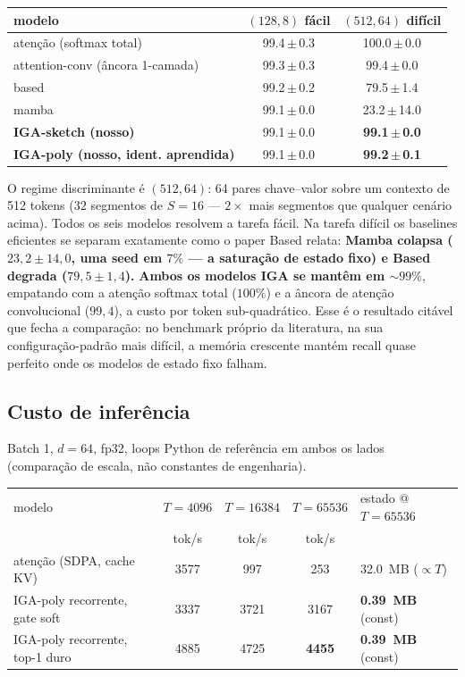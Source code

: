 \documentclass[11pt]{article}
\begin{document}
\begin{table}[h]\centering
\begin{tabular}{lcc}
\toprule
modelo & $(128,8)$ f\'acil & $(512,64)$ dif\'icil \\
\midrule
aten\c{c}\~ao (softmax total)          & 99.4\,$\pm$\,0.3 & 100.0\,$\pm$\,0.0 \\
attention-conv (\^ancora 1-camada)   & 99.3\,$\pm$\,0.3 & 99.4\,$\pm$\,0.0 \\
based                             & 99.2\,$\pm$\,0.2 & 79.5\,$\pm$\,1.4 \\
mamba                             & 99.1\,$\pm$\,0.0 & 23.2\,$\pm$\,14.0 \\
\textbf{IGA-sketch (nosso)}        & 99.1\,$\pm$\,0.0 & \textbf{99.1\,$\pm$\,0.0} \\
\textbf{IGA-poly (nosso, ident. aprendida)} & 99.1\,$\pm$\,0.0 & \textbf{99.2\,$\pm$\,0.1} \\
\bottomrule
\end{tabular}
\end{table}

O regime discriminante \'e $(512,64)$: 64 pares chave--valor sobre um contexto
de 512 tokens ($32$ segmentos de $S=16$ --- $2\times$ mais segmentos que qualquer
cen\'ario acima). Todos os seis modelos resolvem a tarefa f\'acil. Na tarefa
dif\'icil os baselines eficientes se separam exatamente como o paper Based
relata: \textbf{Mamba colapsa ($23{,}2\pm14{,}0$, uma seed em $7\%$ --- a
satura\c{c}\~ao de estado fixo) e Based degrada ($79{,}5\pm1{,}4$).}
\textbf{Ambos os modelos IGA se mant\^em em $\sim\!99\%$}, empatando com a
aten\c{c}\~ao softmax total ($100\%$) e a \^ancora de aten\c{c}\~ao convolucional
($99{,}4$), a custo por token sub-quadr\'atico. Esse \'e o resultado cit\'avel que
fecha a compara\c{c}\~ao: no benchmark pr\'oprio da literatura, na sua
configura\c{c}\~ao-padr\~ao mais dif\'icil, a mem\'oria crescente mant\'em recall
quase perfeito onde os modelos de estado fixo falham.

\subsection{Custo de infer\^encia}

Batch 1, $d=64$, fp32, loops Python de refer\^encia em ambos os lados
(compara\c{c}\~ao de escala, n\~ao constantes de engenharia).

\begin{table}[h]\centering
\begin{tabular}{lcccl}
\toprule
modelo & $T{=}4096$ & $T{=}16384$ & $T{=}65536$ & estado @ $T{=}65536$ \\
 & tok/s & tok/s & tok/s & \\
\midrule
aten\c{c}\~ao (SDPA, cache KV)      & 3577 & 997 & 253 & 32.0~MB ($\propto T$) \\
IGA-poly recorrente, gate soft   & 3337 & 3721 & 3167 & \textbf{0.39~MB} (const) \\
IGA-poly recorrente, top-1 duro & 4885 & 4725 & \textbf{4455} & \textbf{0.39~MB} (const) \\
\bottomrule
\end{tabular}
\end{table}
\end{document}
